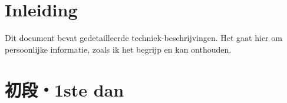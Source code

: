 \documentclass[a4paper, 12pt]{article}
\begin{document}

\begin{CJK*}{UTF8}{min}
\CJKtilde
\setlength\parindent{0pt} %



\newpage
\setcounter{page}{1}
\tableofcontents

\newpage
\setcounter{page}{1}

\section{Inleiding}
Dit document bevat gedetailleerde techniek-beschrijvingen. Het gaat hier om persoonlijke informatie, zoals ik het begrijp en kan onthouden.

\newpage
\section{初段・1ste dan}


%
%
%
%
%
%
%
%
\end{CJK*}
\end{document}
